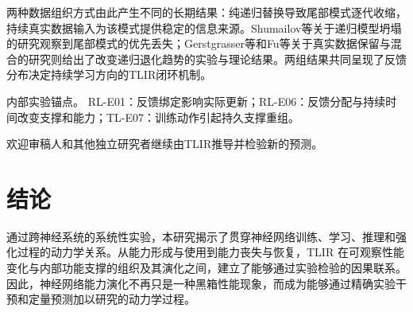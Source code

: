 两种数据组织方式由此产生不同的长期结果：纯递归替换导致尾部模式逐代收缩，持续真实数据输入为该模式提供稳定的信息来源。Shumailov等关于递归模型坍塌的研究观察到尾部模式的优先丢失；Gerstgrasser等和Fu等关于真实数据保留与混合的研究则给出了改变递归退化趋势的实验与理论结果。两组结果共同呈现了反馈分布决定持续学习方向的TLIR闭环机制。 \cite{shumailov2024,gerstgrasser2024,fu2024}

内部实验锚点。 RL-E01：反馈绑定影响实际更新；RL-E06：反馈分配与持续时间改变支撑和能力；TL-E07：训练动作引起持久支撑重组。

欢迎审稿人和其他独立研究者继续由TLIR推导并检验新的预测。

\section{结论}

通过跨神经系统的系统性实验，本研究揭示了贯穿神经网络训练、学习、推理和强化过程的动力学关系。从能力形成与使用到能力丧失与恢复，TLIR 在可观察性能变化与内部功能支撑的组织及其演化之间，建立了能够通过实验检验的因果联系。因此，神经网络能力演化不再只是一种黑箱性能现象，而成为能够通过精确实验干预和定量预测加以研究的动力学过程。
